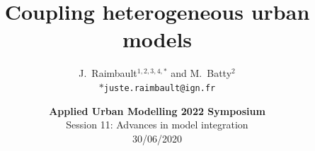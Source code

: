 \documentclass[english,11pt]{beamer}
\begin{document}
\title{Coupling heterogeneous urban models}

\author{J.~Raimbault$^{1,2,3,4, \ast}$ and M.~Batty$^{2}$\\
$\ast$\texttt{juste.raimbault@ign.fr}
}




\date{\textbf{Applied Urban Modelling 2022 Symposium}\\
Session 11: Advances in model integration\\
30/06/2020
}






\end{document}
